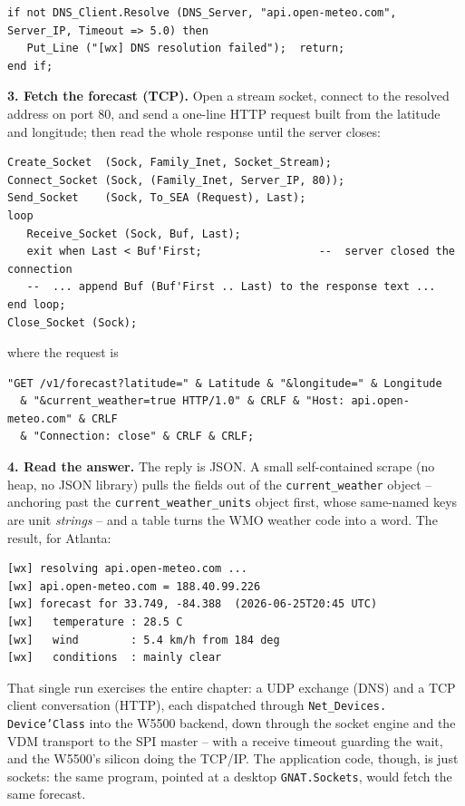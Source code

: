 \begin{lstlisting}
if not DNS_Client.Resolve (DNS_Server, "api.open-meteo.com", Server_IP, Timeout => 5.0) then
   Put_Line ("[wx] DNS resolution failed");  return;
end if;
\end{lstlisting}

\textbf{3. Fetch the forecast (TCP).} Open a stream socket, connect to the resolved
address on port 80, and send a one-line HTTP request built from the latitude and
longitude; then read the whole response until the server closes:

\begin{lstlisting}
Create_Socket  (Sock, Family_Inet, Socket_Stream);
Connect_Socket (Sock, (Family_Inet, Server_IP, 80));
Send_Socket    (Sock, To_SEA (Request), Last);
loop
   Receive_Socket (Sock, Buf, Last);
   exit when Last < Buf'First;                  --  server closed the connection
   --  ... append Buf (Buf'First .. Last) to the response text ...
end loop;
Close_Socket (Sock);
\end{lstlisting}

where the request is

\begin{lstlisting}
"GET /v1/forecast?latitude=" & Latitude & "&longitude=" & Longitude
  & "&current_weather=true HTTP/1.0" & CRLF & "Host: api.open-meteo.com" & CRLF
  & "Connection: close" & CRLF & CRLF;
\end{lstlisting}

\textbf{4. Read the answer.} The reply is JSON. A small self-contained scrape (no
heap, no JSON library) pulls the fields out of the \texttt{current\_weather}
object -- anchoring past the \texttt{current\_weather\_units} object first, whose
same-named keys are unit \emph{strings} -- and a table turns the WMO weather code
into a word. The result, for Atlanta:

\begin{lstlisting}[style=sh]
[wx] resolving api.open-meteo.com ...
[wx] api.open-meteo.com = 188.40.99.226
[wx] forecast for 33.749, -84.388  (2026-06-25T20:45 UTC)
[wx]   temperature : 28.5 C
[wx]   wind        : 5.4 km/h from 184 deg
[wx]   conditions  : mainly clear
\end{lstlisting}

That single run exercises the entire chapter: a UDP exchange (DNS) and a TCP
client conversation (HTTP), each dispatched through \texttt{Net\_Devices.%
Device'Class} into the W5500 backend, down through the socket engine and the VDM
transport to the SPI master -- with a receive timeout guarding the wait, and the
W5500's silicon doing the TCP/IP. The application code, though, is just sockets:
the same program, pointed at a desktop \texttt{GNAT.Sockets}, would fetch the same
forecast.

